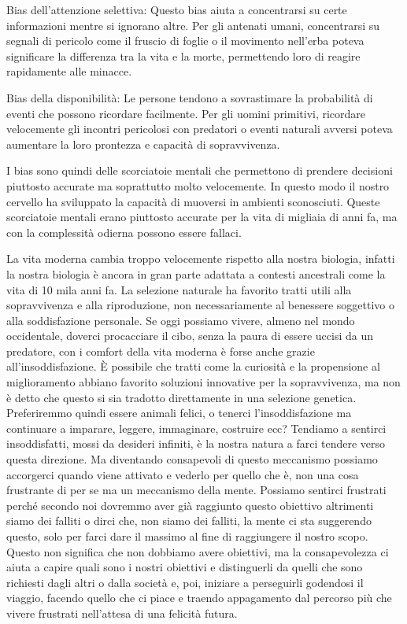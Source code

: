 \documentclass[12pt]{book} %
\begin{document}
Bias dell'attenzione selettiva: Questo bias aiuta a concentrarsi su certe informazioni mentre si
ignorano altre. Per gli antenati umani, concentrarsi su segnali di pericolo come il fruscio di foglie o il movimento
nell'erba poteva significare la differenza tra la vita e la morte, permettendo loro di reagire
rapidamente alle minacce.

Bias della disponibilità: Le persone tendono a sovrastimare la probabilità di eventi che possono ricordare facilmente.
Per gli uomini primitivi, ricordare velocemente gli incontri pericolosi con predatori o eventi naturali avversi poteva
aumentare la loro prontezza e capacità di sopravvivenza.

I bias sono quindi delle scorciatoie mentali che permettono di prendere decisioni piuttosto accurate ma soprattutto
molto velocemente. In questo modo il nostro cervello ha sviluppato la capacità di muoversi in ambienti sconosciuti.
Queste scorciatoie mentali erano piuttosto accurate per la vita di migliaia di anni fa, ma con la complessità odierna
possono essere fallaci.

La vita moderna cambia troppo velocemente rispetto alla nostra biologia, infatti la nostra biologia è ancora in gran parte adattata a contesti ancestrali come la vita di 10 mila anni fa. 
La selezione naturale ha favorito tratti utili alla sopravvivenza e alla riproduzione, non necessariamente al benessere soggettivo o alla soddisfazione personale. Se oggi possiamo
vivere, almeno nel mondo occidentale, doverci procacciare il cibo, senza la paura di essere uccisi da un predatore, con
i comfort della vita moderna è forse anche grazie all'insoddisfazione. 
È possibile che tratti come la curiosità e la propensione al miglioramento abbiano favorito soluzioni innovative per la sopravvivenza, ma non è detto che questo si sia tradotto direttamente in una selezione genetica.
Preferiremmo quindi essere animali felici, o tenerci l'insoddisfazione ma continuare a
imparare, leggere, immaginare, costruire ecc? 
Tendiamo a sentirci insoddisfatti, mossi da desideri infiniti, è la nostra natura a farci tendere verso questa direzione. 
Ma diventando consapevoli di questo meccanismo possiamo accorgerci quando viene
attivato e vederlo per quello che è, non una cosa frustrante di per se ma un meccanismo della mente. 
Possiamo sentirci frustrati perché secondo noi dovremmo aver già raggiunto questo obiettivo altrimenti siamo dei falliti o dirci che, non
siamo dei falliti, la mente ci sta suggerendo questo, solo per farci dare il massimo al fine di raggiungere il nostro
scopo. Questo non significa che non dobbiamo avere obiettivi, ma la consapevolezza ci aiuta a capire quali sono i
nostri obiettivi e distinguerli da quelli che sono richiesti dagli altri o dalla società e, poi, iniziare a perseguirli
godendosi il viaggio, facendo quello che ci piace e traendo appagamento dal percorso più che vivere frustrati
nell'attesa di una felicità futura.
\end{document}
